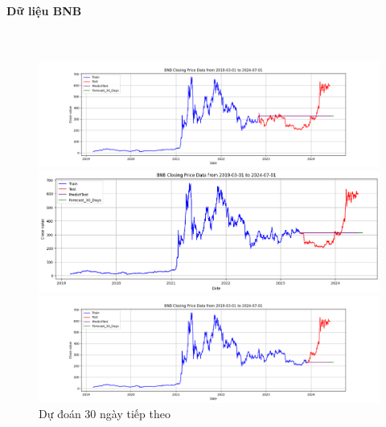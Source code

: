 \documentclass[conference]{IEEEtran}
\begin{document}
	\paragraph{\textbf{Dữ liệu BNB}} \mbox{} \\
	\begin{figure}[H]
		\centering
		\begin{minipage}{0.15\textwidth}
			\centering
			
			\includegraphics[width=1\textwidth]{Figure/ARIMA_BNB_30days_73.png}
		\end{minipage}
		\hfill
		\begin{minipage}{0.15\textwidth}
			\centering
			\includegraphics[width=1\textwidth]{Figure/ARIMA_BNB_30days_82.png}
		\end{minipage}
		\hfill
		\begin{minipage}{0.15\textwidth}
			\centering
			\includegraphics[width=1\textwidth]{Figure/ARIMA_BNB_30days_91.png}
		\end{minipage}
		\caption{Dự đoán 30 ngày tiếp theo}
		\label{fig:1}
	\end{figure}
	
\end{document}
